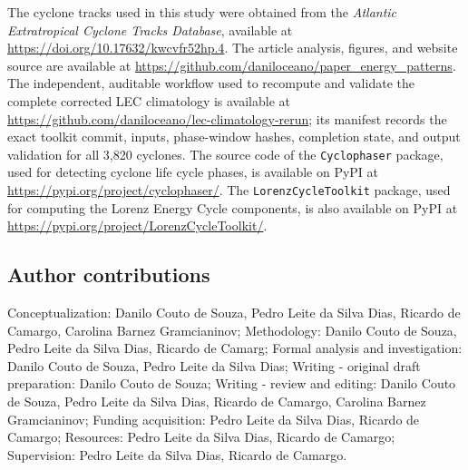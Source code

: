 \documentclass[pdflatex,sn-chicago]{sn-jnl}%
\theoremstyle{plain}
\theoremstyle{definition}
\theoremstyle{remark}
\theoremstyle{definition}
\begin{document}
The cyclone tracks used in this study were obtained from the \textit{Atlantic Extratropical Cyclone Tracks Database}, available at \url{https://doi.org/10.17632/kwcvfr52hp.4}. The article analysis, figures, and website source are available at \url{https://github.com/daniloceano/paper_energy_patterns}. The independent, auditable workflow used to recompute and validate the complete corrected LEC climatology is available at \url{https://github.com/daniloceano/lec-climatology-rerun}; its manifest records the exact toolkit commit, inputs, phase-window hashes, completion state, and output validation for all 3{,}820 cyclones. The source code of the \texttt{Cyclophaser} package, used for detecting cyclone life cycle phases, is available on PyPI at \url{https://pypi.org/project/cyclophaser/}. The \texttt{LorenzCycleToolkit} package, used for computing the Lorenz Energy Cycle components, is also available on PyPI at \url{https://pypi.org/project/LorenzCycleToolkit/}.

\subsection*{Author contributions}

Conceptualization: Danilo Couto de Souza, Pedro Leite da Silva Dias, Ricardo de Camargo, Carolina Barnez Gramcianinov; Methodology: Danilo Couto de Souza, Pedro Leite da Silva Dias, Ricardo de Camarg; Formal analysis and investigation: Danilo Couto de Souza, Pedro Leite da Silva Dias; Writing - original draft preparation: Danilo Couto de Souza; Writing - review and editing: Danilo Couto de Souza, Pedro Leite da Silva Dias, Ricardo de Camargo, Carolina Barnez Gramcianinov; Funding acquisition: Pedro Leite da Silva Dias, Ricardo de Camargo; Resources: Pedro Leite da Silva Dias, Ricardo de Camargo; Supervision: Pedro Leite da Silva Dias, Ricardo de Camargo.

\end{document}
